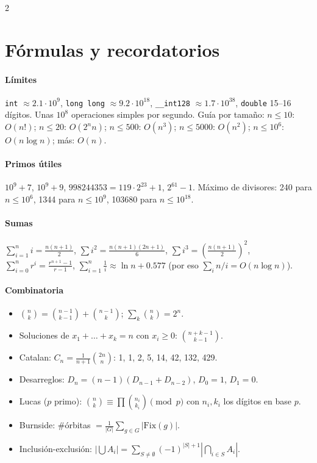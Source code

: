 \documentclass[8pt,a4paper,landscape]{extarticle}
\begin{document}
\begin{multicols*}{2}
\section{F\'ormulas y recordatorios}

\paragraph{L\'imites}
\texttt{int} $\approx 2.1\cdot10^9$, \texttt{long long}
$\approx 9.2\cdot10^{18}$, \texttt{\_\_int128} $\approx 1.7\cdot10^{38}$,
\texttt{double} 15--16 d\'igitos. Unas $10^8$ operaciones simples por
segundo. Gu\'ia por tama\~no: $n\le 10$: $O(n!)$; $n\le 20$: $O(2^n n)$;
$n\le 500$: $O(n^3)$; $n\le 5000$: $O(n^2)$; $n\le 10^6$:
$O(n\log n)$; m\'as: $O(n)$.

\paragraph{Primos \'utiles}
$10^9+7$, $10^9+9$, $998244353 = 119\cdot2^{23}+1$, $2^{61}-1$.
M\'aximo de divisores: 240 para $n\le10^6$, 1344 para $n\le10^9$,
103680 para $n\le10^{18}$.

\paragraph{Sumas}
$\sum_{i=1}^n i = \frac{n(n+1)}{2}$,\;
$\sum i^2 = \frac{n(n+1)(2n+1)}{6}$,\;
$\sum i^3 = \left(\frac{n(n+1)}{2}\right)^2$,\;
$\sum_{i=0}^n r^i = \frac{r^{n+1}-1}{r-1}$,\;
$\sum_{i=1}^n \frac1i \approx \ln n + 0.577$
(por eso $\sum_i n/i = O(n\log n)$).

\paragraph{Combinatoria}
\begin{itemize}
\item $\binom{n}{k} = \binom{n-1}{k-1} + \binom{n-1}{k}$;\;
  $\sum_k \binom{n}{k} = 2^n$.
\item Soluciones de $x_1+\dots+x_k = n$ con $x_i \ge 0$:
  $\binom{n+k-1}{k-1}$.
\item Catalan: $C_n = \frac{1}{n+1}\binom{2n}{n}$:
  1, 1, 2, 5, 14, 42, 132, 429.
\item Desarreglos: $D_n = (n-1)(D_{n-1}+D_{n-2})$, $D_0=1$, $D_1=0$.
\item Lucas ($p$ primo): $\binom{n}{k} \equiv \prod \binom{n_i}{k_i}
  \pmod p$ con $n_i, k_i$ los d\'igitos en base $p$.
\item Burnside: \#\'orbitas $= \frac{1}{|G|}\sum_{g\in G}
  |\mathrm{Fix}(g)|$.
\item Inclusi\'on-exclusi\'on: $|\bigcup A_i| = \sum_{S\neq\emptyset}
  (-1)^{|S|+1} |\bigcap_{i\in S} A_i|$.
\end{itemize}


\end{multicols*}
\end{document}
